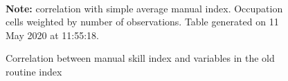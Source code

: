 \begin{figure}[!h]
\caption{Correlation between manual skill index and variables in the old routine index}
\label{fig:oldRoutine}
  \\ 
\par \begin{minipage}[h]{\textwidth}{\scriptsize\textbf{Note:} correlation with simple average manual index. Occupation cells weighted by number of observations. Table generated on 11 May 2020 at 11:55:18.}\end{minipage}
\end{figure}
